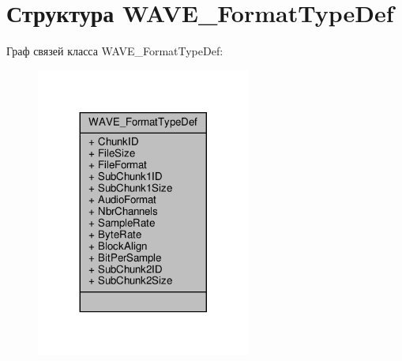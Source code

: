 \hypertarget{struct_w_a_v_e___format_type_def}{}\section{Структура W\+A\+V\+E\+\_\+\+Format\+Type\+Def}
\label{struct_w_a_v_e___format_type_def}


Граф связей класса W\+A\+V\+E\+\_\+\+Format\+Type\+Def\+:\nopagebreak
\begin{figure}[H]
\begin{center}
\leavevmode
\includegraphics[width=200pt]{struct_w_a_v_e___format_type_def__coll__graph}
\end{center}
\end{figure}
